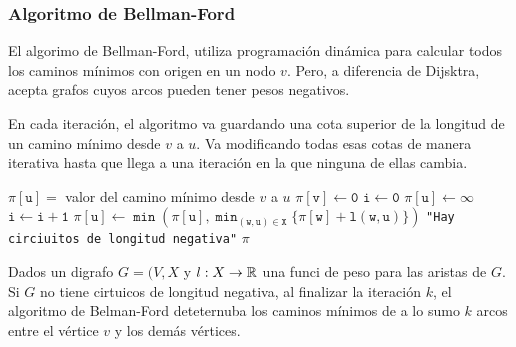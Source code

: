 \subsubsection{Algoritmo de Bellman-Ford}
El algorimo de Bellman-Ford, utiliza programación dinámica para calcular todos los caminos mínimos con origen en un nodo \(v\). Pero, a diferencia de Dijsktra, acepta grafos cuyos arcos pueden tener pesos negativos.

En cada iteración, el algoritmo va guardando una cota superior de la longitud de un camino mínimo desde \(v\) a \(u\). Va modificando todas esas cotas de manera iterativa hasta que llega a una iteración en la que ninguna de ellas cambia.

\begin{algorithmic}
  \State $\mathtt{\pi[u] =}$ valor del camino mínimo desde $v$ a $u$
  \State
  \State $\mathtt{\pi[v] \gets 0}$
  \State $\mathtt{i \gets 0}$
  \State $\mathtt{\pi[u] \gets \infty}$
  \EndFor
  \State
  \State $\mathtt{i\gets i + 1}$
  \State $\mathtt{\pi[u] \gets \min(\pi[u], \min_{(w,u)\in X}\{\pi[w] + l(w,u)\})}$
  \EndFor
  \EndWhile
  \State\Return\texttt{"Hay circiuitos de longitud negativa"}
  \Else
  \State\Return \(\pi\)
  \EndIf
  \EndProcedure
\end{algorithmic}

\begin{lema}
  Dados un digrafo \(G=(V,X\) y \(l:X\to\mathbb{R}\) una funci de peso para las aristas de \(G\). Si \(G\) no tiene cirtuicos de longitud negativa, al finalizar la iteración \(k\), el algoritmo de Belman-Ford deteternuba los caminos mínimos de a lo sumo \(k\) arcos entre el vértice \(v\) y los demás vértices.
\end{lema}

